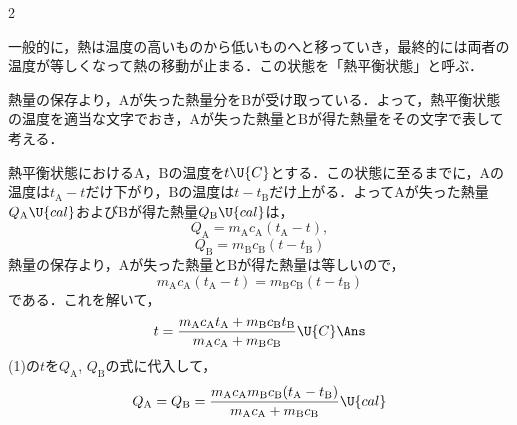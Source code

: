 \begin{multicols}{2}
\par\nopagebreak
\begin{sisin}
一般的に，熱は温度の高いものから低いものへと移っていき，最終的には両者の温度が等しくなって熱の移動が止まる．この状態を「熱平衡状態」と呼ぶ．

熱量の保存より，$\mathrm{A}$が失った熱量分を$\mathrm{B}$が受け取っている．よって，熱平衡状態の温度を適当な文字でおき，$\mathrm{A}$が失った熱量と$\mathrm{B}$が得た熱量をその文字で表して考える．
\end{sisin}
\par\nopagebreak
\begin{komon}
 熱平衡状態における$\mathrm{A}$，$\mathrm{B}$の温度を$t\U{C}$とする．この状態に至るまでに，$\mathrm{A}$の温度は$t_{\mathrm{A}}-t$だけ下がり，$\mathrm{B}$の温度は$t-t_{\mathrm{B}}$だけ上がる．よって$\mathrm{A}$が失った熱量$Q_{\mathrm{A}}\U{cal}$および$\mathrm{B}$が得た熱量$Q_{\mathrm{B}}\U{cal}$は，
       \[Q_{\mathrm{A}}=m_{\mathrm{A}}c_{\mathrm{A}}(t_{\mathrm{A}}-t),\]
       \[Q_{\mathrm{B}}=m_{\mathrm{B}}c_{\mathrm{B}}(t-t_{\mathrm{B}})\]
       \hspace{1zw}熱量の保存より，$\mathrm{A}$が失った熱量と$\mathrm{B}$が得た熱量は等しいので，
       \[m_{\mathrm{A}}c_{\mathrm{A}}(t_{\mathrm{A}}-t)=m_{\mathrm{B}}c_{\mathrm{B}}(t-t_{\mathrm{B}})\]
       である．これを解いて，
       \[t=\frac{m_{\mathrm{A}}c_{\mathrm{A}}t_{\mathrm{A}}+m_{\mathrm{B}}c_{\mathrm{B}}t_{\mathrm{B}}}{m_{\mathrm{A}}c_{\mathrm{A}}+m_{\mathrm{B}}c_{\mathrm{B}}}\U{C}\Ans\]
 (1)の$t$を$Q_{\mathrm{A}}$, $Q_{\mathrm{B}}$の式に代入して，
       \[Q_{\mathrm{A}}=Q_{\mathrm{B}}=\frac{m_{\mathrm{A}}c_{\mathrm{A}}m_{\mathrm{B}}c_{\mathrm{B}}(t_{\mathrm{A}}-t_{\mathrm{B}})}{m_{\mathrm{A}}c_{\mathrm{A}}+m_{\mathrm{B}}c_{\mathrm{B}}}\U{cal}\]
       \hspace*{\fill}\Ans
\end{komon}


\end{multicols}
